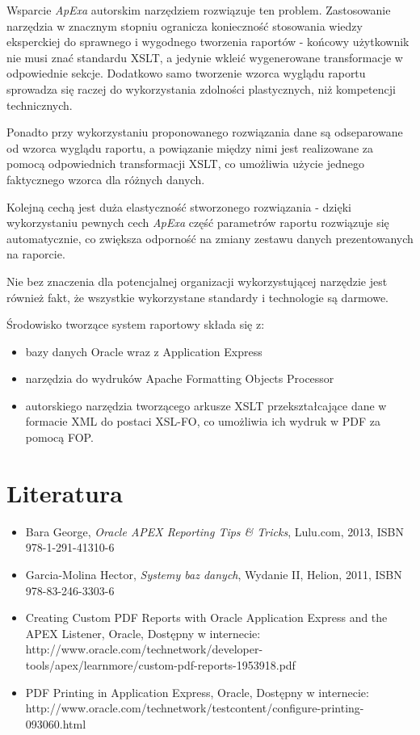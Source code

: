 \documentclass[11pt,a4paper]{article}
\begin{document}
Wsparcie \emph{ApExa} autorskim narzędziem rozwiązuje ten problem. Zastosowanie narzędzia w znacznym stopniu ogranicza konieczność stosowania wiedzy eksperckiej do sprawnego i wygodnego tworzenia raportów - końcowy użytkownik nie musi znać standardu XSLT, a jedynie wkleić wygenerowane transformacje w odpowiednie sekcje. Dodatkowo samo tworzenie wzorca wyglądu raportu sprowadza się raczej do wykorzystania zdolności plastycznych, niż kompetencji technicznych.

Ponadto przy wykorzystaniu proponowanego rozwiązania dane są odseparowane od wzorca wyglądu raportu, a powiązanie między nimi jest realizowane za pomocą odpowiednich transformacji XSLT, co umożliwia użycie jednego faktycznego wzorca dla różnych danych.  

Kolejną cechą jest duża elastyczność stworzonego rozwiązania - dzięki wykorzystaniu pewnych cech \emph{ApExa} część parametrów raportu rozwiązuje się automatycznie, co zwiększa odporność na zmiany zestawu danych prezentowanych na raporcie. 

Nie bez znaczenia dla potencjalnej organizacji wykorzystującej narzędzie jest również fakt, że wszystkie wykorzystane standardy i technologie są darmowe. 

Środowisko tworzące system raportowy składa się z:
\begin{itemize}
	\item bazy danych Oracle wraz z Application Express
	\item narzędzia do wydruków Apache Formatting Objects Processor
	\item autorskiego narzędzia tworzącego arkusze XSLT przekształcające dane w formacie XML do postaci XSL-FO, co umożliwia ich wydruk w PDF za pomocą FOP.
\end{itemize}

\newpage

\section{Literatura}
\begin{itemize}
\item Bara George, \emph{Oracle APEX Reporting Tips \& Tricks}, Lulu.com, 2013, ISBN 978-1-291-41310-6
\item Garcia-Molina Hector, \emph{Systemy baz danych}, Wydanie II, Helion, 2011, ISBN 978-83-246-3303-6
\item Creating Custom PDF Reports with Oracle Application Express and the APEX Listener, Oracle, Dostępny w internecie:\\http://www.oracle.com/technetwork/developer-tools/apex/learnmore/custom-pdf-reports-1953918.pdf
\item PDF Printing in Application Express, Oracle, Dostępny w internecie: \\http://www.oracle.com/technetwork/testcontent/configure-printing-093060.html
\end{itemize}
\end{document}
